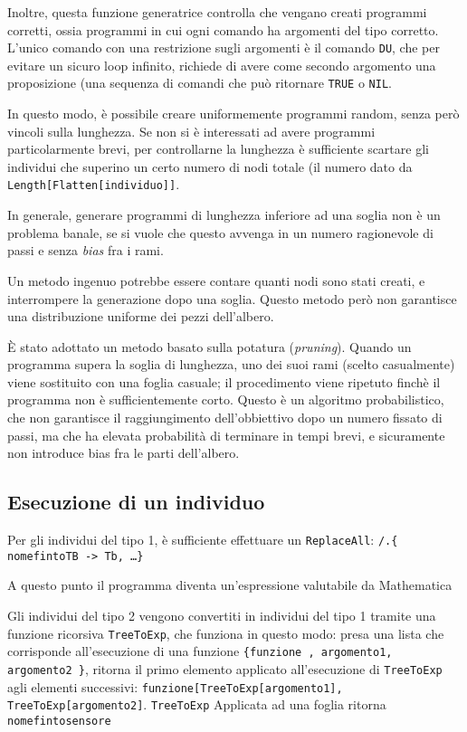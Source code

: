 \documentclass[paper=a4, fontsize=11pt]{scrartcl}
\numberwithin{equation}{section}		%
\numberwithin{figure}{section}			%
\numberwithin{table}{section}				%
\begin{document}
Inoltre, questa funzione generatrice controlla che vengano creati programmi corretti, ossia programmi in cui ogni comando ha argomenti del tipo corretto. L'unico comando con una restrizione sugli argomenti è il comando \texttt{DU}, che per evitare un sicuro loop infinito, richiede di avere come secondo argomento una proposizione (una sequenza di comandi che può ritornare \texttt{TRUE} o \texttt{NIL}. 


In questo modo, è possibile creare uniformemente programmi random, senza però vincoli sulla lunghezza. 
Se non si è interessati ad avere programmi particolarmente brevi, per controllarne la lunghezza è sufficiente scartare gli individui che superino un certo numero di nodi totale (il numero dato da \texttt{Length[Flatten[individuo]]}. 

In generale, generare programmi di lunghezza inferiore ad una soglia non è un problema banale, se si vuole che questo avvenga in un numero ragionevole di passi e senza \emph{bias} fra i rami.

Un metodo ingenuo potrebbe essere contare quanti nodi sono stati creati, e interrompere la generazione dopo una soglia. Questo metodo però non garantisce una distribuzione uniforme dei pezzi dell'albero.

È stato adottato un metodo basato sulla potatura (\emph{pruning}). Quando un programma supera la soglia di lunghezza, uno dei suoi rami (scelto casualmente) viene sostituito con una foglia casuale; il procedimento viene ripetuto finchè il programma non è sufficientemente corto. Questo è un algoritmo probabilistico, che non garantisce il raggiungimento dell'obbiettivo dopo un numero fissato di passi, ma che ha elevata probabilità di terminare in tempi brevi, e sicuramente non introduce bias fra le parti dell'albero.



\subsection{Esecuzione di un individuo}
Per gli individui del tipo 1, è sufficiente effettuare un \texttt{ReplaceAll}: \texttt{/.\{ nomefintoTB -> Tb, \dots  \}}

A questo punto il programma diventa un'espressione valutabile da Mathematica

Gli individui del tipo 2 vengono convertiti in individui del tipo 1 tramite una funzione ricorsiva \texttt{TreeToExp}, che funziona in questo modo: presa una lista che corrisponde all'esecuzione di una funzione \texttt{\{funzione , argomento1, argomento2   \}}, ritorna il primo elemento applicato all'esecuzione di \texttt{TreeToExp} agli elementi successivi: \texttt{funzione[TreeToExp[argomento1], TreeToExp[argomento2]}.
\texttt{TreeToExp} Applicata ad una foglia ritorna \texttt{nomefintosensore}
\end{document}
